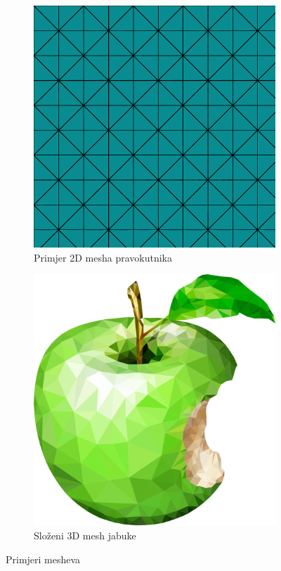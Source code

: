 \documentclass[zavrsnirad]{../fer}
\begin{document}
\begin{figure}[htbp]
  \centering
  \begin{subfigure}[b]{0.45\linewidth}
    \centering
    \includegraphics[width=\linewidth]{Figures/2Dmesh.png}
    \caption{Primjer 2D mesha pravokutnika}
    \label{rectMesh}
  \end{subfigure}
  \hfill
  \begin{subfigure}[b]{0.45\linewidth}
    \centering
    \includegraphics[width=\linewidth]{Figures/apple.png}
    \caption{Složeni 3D mesh jabuke}
    \label{jabuka}
  \end{subfigure}
  \caption{Primjeri mesheva}
  \label{meshevi}
\end{figure}
\end{document}

